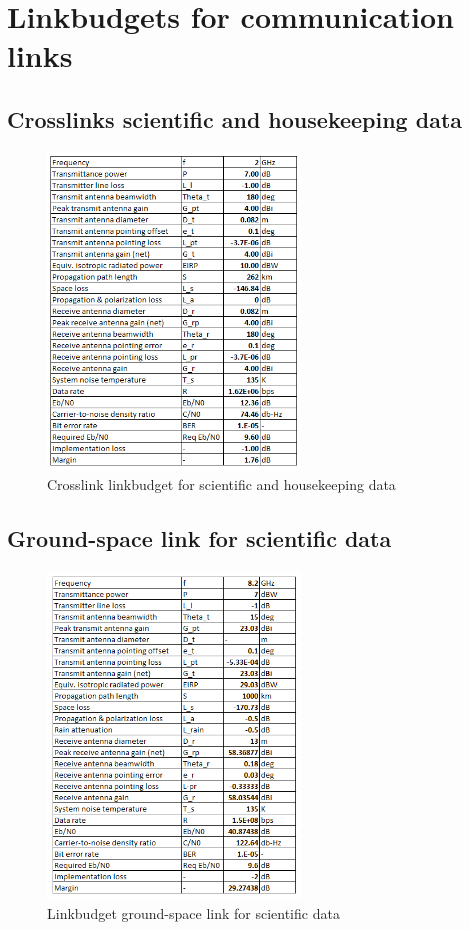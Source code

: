 \documentclass[11pt]{report}
\begin{document}
\chapter{Linkbudgets for communication links}
\label{linkbudgets}
\section{Crosslinks scientific and housekeeping data}

\begin{figure}[ht]
\centering
\includegraphics[width=0.6\textwidth, angle=0]{img/SSlinkbudget.png}
\caption{Crosslink linkbudget for scientific and housekeeping data}
\label{figSSbudget}
\end{figure}

\section{Ground-space link for scientific data}
\begin{figure}[ht]
\centering
\includegraphics[width=0.6\textwidth, angle=0]{img/GSsciencelinkbudget.png}
\caption{Linkbudget ground-space link for scientific data}
\label{figSSbudget}
\end{figure}
\end{document}
